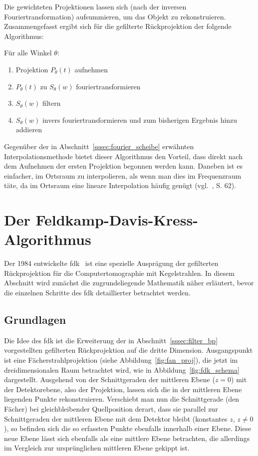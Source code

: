 Die gewichteten Projektionen lassen sich (nach der inversen Fouriertransformation) aufsummieren, um das Objekt zu
rekonstruieren. Zusammengefasst ergibt sich für die gefilterte Rückprojektion der folgende Algorithmus:

Für alle Winkel $\theta$:
\begin{enumerate}
    \item Projektion $P_{\theta}(t)$ aufnehmen
    \item $P_{\theta}(t)$ zu $S_{\theta}(w)$ fouriertransformieren
    \item $S_{\theta}(w)$ filtern
    \item $S_{\theta}(w)$ invers fouriertransformieren und zum bisherigen Ergebnis hinzu addieren
\end{enumerate}

Gegenüber der in Abschnitt~\ref{sssec:fourier_scheibe} erwähnten Interpolationsmethode bietet dieser Algorithmus den
Vorteil, dass direkt nach dem Aufnehmen der ersten Projektion begonnen werden kann. Daneben ist es einfacher, im
Ortsraum zu interpolieren, als wenn man dies im Frequenzraum täte, da im Ortsraum eine lineare Interpolation häufig
genügt (vgl.~\cite{kakslan}, S. 62).

\section{Der Feldkamp-Davis-Kress-Algorithmus}\label{ssec:fdk}

Der 1984 entwickelte \gls{fdk}~\cite{fdk} ist eine spezielle Ausprägung der gefilterten Rückprojektion für die
Computertomographie mit Kegelstrahlen. In diesem Abschnitt wird zunächst die zugrundeliegende Mathematik näher
erläutert, bevor die einzelnen Schritte des \gls{fdk} detaillierter betrachtet werden.

\subsection{Grundlagen}\label{sssec:fdk_math}

Die Idee des \gls{fdk} ist die Erweiterung der in Abschnitt~\ref{sssec:filter_bp} vorgestellten gefilterten
Rückprojektion auf die dritte Dimension. Ausgangspunkt ist eine Fächerstrahlprojektion (siehe
Abbildung~\ref{fig:fan_proj}), die jetzt im dreidimensionalen Raum betrachtet wird, wie in
Abbildung~\ref{fig:fdk_schema} dargestellt. Ausgehend von der Schnittgeraden der mittleren Ebene ($z = 0$) mit der
Detektorebene, also der Projektion, lassen sich die in der mittleren Ebene liegenden Punkte rekonstruieren. Verschiebt
man nun die Schnittgerade (den Fächer) bei gleichbleibender Quellposition derart, dass sie parallel zur Schnittgeraden
der mittleren Ebene mit dem Detektor bleibt (konstantes $z$, $z \neq 0$), so befinden sich die so erfassten Punkte
ebenfalls innerhalb einer Ebene. Diese neue Ebene lässt sich ebenfalls als eine mittlere Ebene betrachten, die
allerdings im Vergleich zur {\glqq}ursprünglichen{\grqq} mittleren Ebene gekippt ist.

